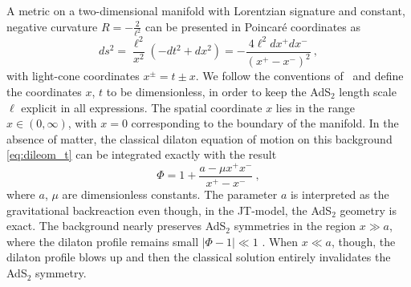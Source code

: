 \documentclass[12pt]{article}
\begin{document}
A metric on a two-dimensional manifold with Lorentzian signature and constant, negative curvature $R = -\frac{2}{\ell^2}$ can be presented in Poincar\'e coordinates as
%
\begin{equation}
	ds^2 = \frac{\ell^2}{x^2}\left(-dt^2 + dx^2\right) = -\frac{4 \ell^2 dx^+ dx^-}{(x^+ - x^-)^2}~,
\end{equation}
%
with light-cone coordinates $x^\pm = t \pm x$. We follow the conventions of~\cite{Almheiri:2014cka} and define the coordinates $x$, $t$ to be dimensionless, in order to keep the AdS$_2$ length scale $\ell$ explicit in all expressions. The spatial coordinate $x$ lies in the range $x \in (0, \infty)$, with $x = 0$ corresponding to the boundary of the manifold.  In the absence of matter, the classical dilaton equation of motion on this background \eqref{eq:dileom_t} can be integrated exactly with the result
%
\begin{equation}
	\Phi = 1 + \frac{a - \mu x^+ x^-}{x^+ - x^-}~,
\label{eq:dil_class}
\end{equation}
%
where $a$, $\mu$ are dimensionless constants.  The parameter $a$ is interpreted as the gravitational backreaction even though, in the JT-model, the AdS$_2$ geometry is exact. The background nearly preserves AdS$_2$ symmetries in the region $x \gg a$, where the dilaton profile remains small $|\Phi-1|\ll 1$ .  When $x \ll a$, though, the dilaton profile blows up and then the classical solution entirely invalidates the AdS$_2$ symmetry.  
\end{document}
